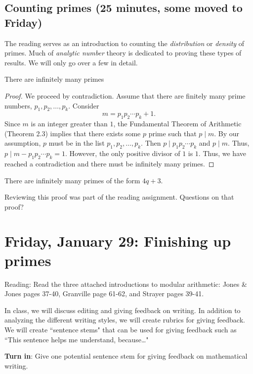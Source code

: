 \documentclass[letterpaper, 11 pt]{article}
\begin{document}
\subsection{Counting primes (25 minutes, some moved to Friday)}
The reading serves as an introduction to counting the \emph{distribution} or \emph{density} of primes. Much of \emph{analytic number} theory is dedicated to proving these types of results. We will only go over a few in detail.

\begin{thm}
There are infinitely many primes 
\end{thm}
\begin{proof}
 We proceed by contradiction. Assume that there are finitely many prime numbers, $p_1,p_2,\dots, p_k$. Consider \[m=p_1p_2\cdots p_k+1.\]
Since $m$ is an integer greater than $1$, the Fundamental Theorem of Arithmetic (Theorem 2.3) implies that there exists some $p$ prime such that $p\mid m$. By our assumption, $p$ must be in the list $p_1,p_2,\dots, p_k$. Then $p\mid p_1p_2\cdots p_k$ and $p\mid m$. Thus, $p\mid m-p_1p_2\cdots p_k=1$. However, the only positive divisor of $1$ is $1$. Thus, we have reached a contradiction and there must be infinitely many primes.
\end{proof}

\begin{thm}
 There are infinitely many primes of the form $4q+3$.
\end{thm}

Reviewing this proof was part of the reading assignment. Questions on that proof?



\section{Friday, January 29: Finishing up primes}
Reading: Read the three attached introductions to modular arithmetic: Jones \& Jones pages 37-40, Granville page 61-62, and Strayer pages 39-41.

In class, we will discuss editing and giving feedback on writing. In addition to analyzing the different writing styles, we will create rubrics for giving feedback. We will create ``sentence stems" that can be used for giving feedback such as ``This sentence helps me understand, because\dots"

{\bf Turn in}: Give one potential sentence stem for giving feedback on mathematical writing.
\end{document}
